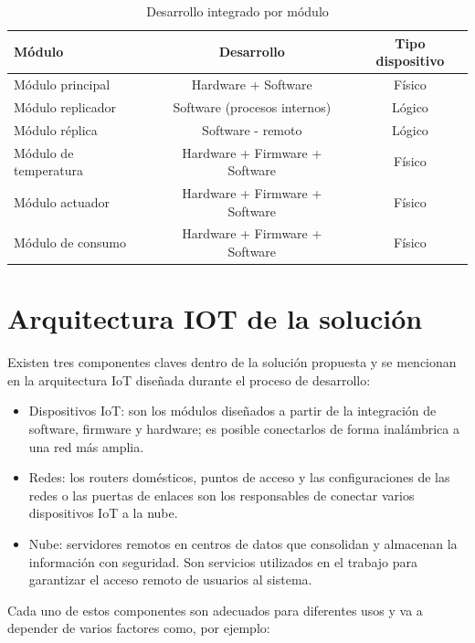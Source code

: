 \begin{table}[h]
	\centering
	\caption[Desarrollo integrado por módulo]{Desarrollo integrado por módulo}
	\begin{tabular}{l c c }    
		\toprule
		\textbf{Módulo} 	 & \textbf{Desarrollo}  & \textbf{Tipo dispositivo}\\
		\midrule
		Módulo principal & Hardware + Software & Físico\\		
		Módulo replicador & Software (procesos internos)& Lógico \\
		Módulo réplica & Software - remoto & Lógico \\
		Módulo de temperatura & Hardware + Firmware + Software & Físico\\		
		Módulo actuador & Hardware + Firmware + Software & Físico\\		
		Módulo de consumo	 & Hardware + Firmware + Software & Físico\\
		
		\bottomrule
		\hline
	\end{tabular}
	\label{tab:tablamodulos}
\end{table}


\section{Arquitectura IOT de la solución}

Existen tres componentes claves dentro de la solución propuesta y se mencionan en la arquitectura IoT diseñada durante el proceso de desarrollo: 


\begin{itemize}
\item Dispositivos IoT: son los módulos diseñados a partir de la integración de software, firmware y hardware; es posible conectarlos de forma inalámbrica a una red más amplia.
\item Redes: los routers domésticos, puntos de acceso y las configuraciones de las redes o las puertas de enlaces son los responsables de conectar varios dispositivos IoT a la nube.
\item Nube: servidores remotos en centros de datos que consolidan y almacenan la información con seguridad. Son servicios utilizados en el trabajo para garantizar el acceso remoto de usuarios al sistema.
\end{itemize}
\vspace{0.5cm}
Cada uno de estos componentes son adecuados para diferentes usos y va a depender de varios factores como, por ejemplo:

